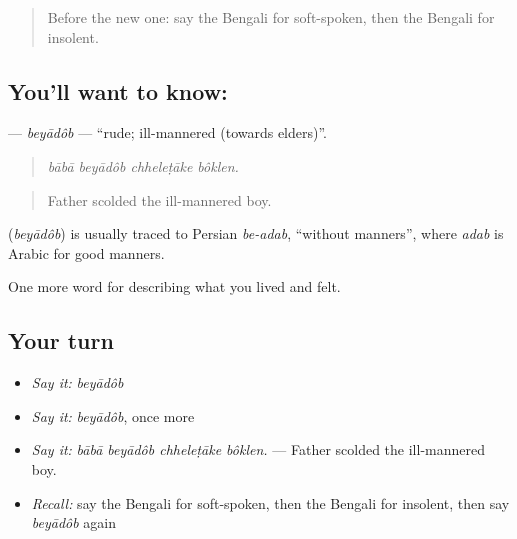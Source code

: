 \label{lesson:BN-C459-beyadob}



\begin{quote}
Before the new one: say the Bengali for soft-spoken, then the Bengali for insolent.
\end{quote}

\subsection*{You'll want to know: }
\textbf{} — \emph{beyādôb} — \textquotedblleft{}rude; ill-mannered (towards elders)\textquotedblright{}.

\begin{quote}
   
\end{quote}

\begin{quote}
\emph{bābā beyādôb chheleṭāke bôklen.}
\end{quote}

\begin{quote}
Father scolded the ill-mannered boy.
\end{quote}

\begin{cousinweb}
\textbf{} (\emph{beyādôb}) is usually traced to Persian \emph{be-adab}, \textquotedblleft{}without manners\textquotedblright{}, where \emph{adab} is Arabic for good manners.
\end{cousinweb}

\begin{grammarlens}[title={What you've built}]
One more word for describing what you lived and felt.
\end{grammarlens}

\subsection*{Your turn}
\begin{itemize}
\raggedright
  \item \emph{Say it:} \emph{beyādôb}
  \item \emph{Say it:} \emph{beyādôb}, once more
  \item \emph{Say it:} \emph{bābā beyādôb chheleṭāke bôklen.} — Father scolded the ill-mannered boy.
  \item \emph{Recall:} say the Bengali for soft-spoken, then the Bengali for insolent, then say \emph{beyādôb} again
\end{itemize}

